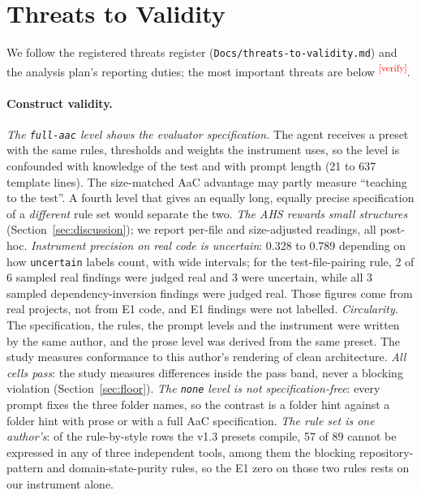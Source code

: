 \documentclass[10pt,a4paper]{article}
\newcommand{\citeneeded}[1]{\cite{#1}\textsuperscript{\textcolor{red}{\tiny[verify]}}}
\newcommand{\lev}[1]{\texttt{\small #1}}
\begin{document}
\section{Threats to Validity}\label{sec:threats}

We follow the registered threats register (\texttt{Docs/threats-to-validity.md}) and the analysis plan's reporting
duties; the most important threats are below \citeneeded{wohlin2012experimentation,sallou2024breaking}.

\paragraph{Construct validity.}
\emph{The \lev{full-aac} level shows the evaluator specification.} The agent receives a preset with the same rules,
thresholds and weights the instrument uses, so the level is confounded with knowledge of the test and with prompt
length (21 to 637 template lines). %
The size-matched AaC advantage may partly measure ``teaching to the test''. A fourth level that gives an equally
long, equally precise specification of a \emph{different} rule set would separate the two.
\emph{The AHS rewards small structures} (Section~\ref{sec:discussion}); we report per-file and size-adjusted readings,
all post-hoc. \emph{Instrument precision on real code is uncertain}: 0.328 to 0.789 depending on how
\texttt{uncertain} labels count, with wide intervals; for the test-file-pairing rule, 2 of 6 sampled real findings
were judged real and 3 were uncertain, while all 3 sampled dependency-inversion findings were judged real.
Those figures come from real projects, not from E1 code, and E1 findings were not labelled.
\emph{Circularity.} The specification, the rules, the prompt levels and the instrument were written by the same
author, and the prose level was derived from the same preset. The study measures conformance to this author's
rendering of clean architecture. %
\emph{All cells pass}: the study measures differences inside the pass band, never a blocking violation
(Section~\ref{sec:floor}). \emph{The \lev{none} level is not specification-free}: every prompt fixes the three
folder names, so the contrast is a folder hint against a folder hint with prose or with a full AaC specification.
\emph{The rule set is one author's}: of the rule-by-style rows the v1.3 presets compile, 57 of 89 cannot be expressed
in any of three independent tools, among them the blocking repository-pattern and domain-state-purity rules, so the
E1 zero on those two rules rests on our instrument alone.
\end{document}
